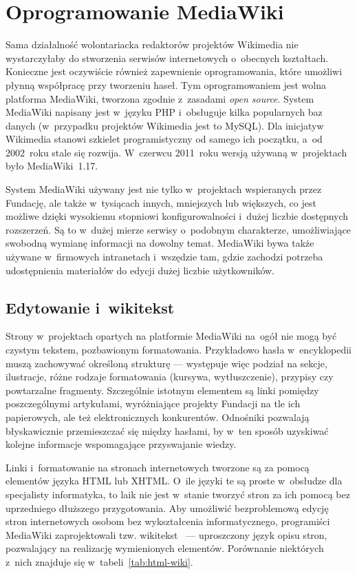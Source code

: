 \section{Oprogramowanie MediaWiki}
\label{sec:mw}
Sama działalność wolontariacka redaktorów projektów Wikimedia nie wystarczyłaby do stworzenia serwisów internetowych o~obecnych kształtach. Konieczne jest oczywiście również zapewnienie oprogramowania, które umożliwi płynną współpracę przy tworzeniu haseł. Tym oprogramowaniem jest wolna platforma MediaWiki, tworzona zgodnie z~zasadami \emph{open source}. System MediaWiki napisany jest w~języku PHP i~obsługuje kilka popularnych baz danych (w~przypadku projektów Wikimedia jest to MySQL). Dla inicjatyw Wikimedia stanowi szkielet programistyczny od samego ich początku, a~od 2002~roku stale się rozwija. W~czerwcu 2011~roku wersją używaną w~projektach było MediaWiki~1.17.

System MediaWiki używany jest nie tylko w~projektach wspieranych przez Fundację, ale także w~tysiącach innych, mniejszych lub większych, co jest możliwe dzięki wysokiemu stopniowi konfigurowalności i~dużej liczbie dostępnych rozszerzeń. Są to w~dużej mierze serwisy o~podobnym charakterze, umożliwiające swobodną wymianę informacji na dowolny temat. MediaWiki bywa także używane w~firmowych intranetach i~wszędzie tam, gdzie zachodzi potrzeba udostępnienia materiałów do edycji dużej liczbie użytkowników.

\subsection{Edytowanie i~wikitekst}
Strony w~projektach opartych na platformie MediaWiki na~ogół nie mogą być czystym tekstem, pozbawionym formatowania. Przykładowo hasła w~encyklopedii muszą zachowywać określoną strukturę --- występuje więc podział na sekcje, ilustracje, różne rodzaje formatowania (kursywa, wytłuszczenie), przypisy czy powtarzalne fragmenty. Szczególnie istotnym elementem są linki pomiędzy poszczególnymi artykułami, wyróżniające projekty Fundacji na tle ich papierowych, ale też elektronicznych konkurentów. Odnośniki pozwalają błyskawicznie przemieszczać się między hasłami, by w~ten sposób uzyskiwać kolejne informacje wspomagające przyswajanie wiedzy.

Linki i~formatowanie na stronach internetowych tworzone są za pomocą elementów języka HTML lub XHTML. O~ile języki te są proste w~obsłudze dla specjalisty informatyka, to laik nie jest w~stanie tworzyć stron za ich pomocą bez uprzedniego dłuższego przygotowania. Aby umożliwić bezproblemową edycję stron internetowych osobom bez wykształcenia informatycznego, programiści MediaWiki zaprojektowali tzw. wikitekst~\cite{mw:help} --- uproszczony język opisu stron, pozwalający na realizację wymienionych elementów. Porównanie niektórych z~nich znajduje się w~tabeli~\ref{tab:html-wiki}.

